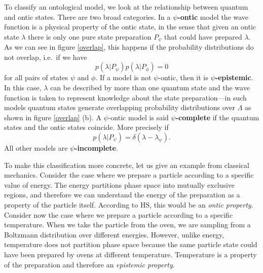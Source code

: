 \documentclass[twocolumn,prl,floatfix,superscriptaddress]{revtex4-2}
\begin{document}
To classify an ontological model, we look at the relationship between quantum and ontic states. There are two broad categories. In a \textbf{$\psi$-ontic} model the wave function is a physical property of the ontic state, in the sense that given an ontic state $\lambda$ there is only one pure state preparation $P_\psi$ that could have prepared $\lambda$. As we can see in figure \ref{overlap}, this happens if the probability distributions do not overlap, i.e.\ if we have
\begin{equation}\label{ontic_condition}
	p(\lambda | P_{\psi})p(\lambda|P_{\phi})=0
\end{equation}
for all pairs of states $\psi$ and $\phi$. If a model is not $\psi$-ontic, then it is \textbf{$\psi$-epistemic}. In this case, $\lambda$ can be described by more than one quantum state and the wave function is taken to represent knowledge about the state preparation---in such models quantum states generate overlapping probability distributions over $\Lambda$ as shown in figure \ref{overlap} (b). A $\psi$-ontic model is said \textbf{$\psi$-complete} if the quantum states and the ontic states coincide. More precisely if 
\begin{equation}\label{complete_condition}
	p(\lambda|P_\psi)=\delta(\lambda-\lambda_{\psi}).
\end{equation}
All other models are \textbf{$\psi$-incomplete}.

To make this classification more concrete, let us give an example from classical mechanics. Consider the case where we prepare a particle according to a specific value of energy. The energy partitions phase space into mutually exclusive regions, and therefore we can understand the energy of the preparation as a property of the particle itself. According to HS, this would be an \emph{ontic property}. Consider now the case where we prepare a particle according to a specific temperature. When we take the particle from the oven, we are sampling from a Boltzmann distribution over different energies. However, unlike energy, temperature does not partition phase space because the same particle state could have been prepared by ovens at different temperature. Temperature is a property of the preparation and therefore an \emph{epistemic property}. 

\end{document}
